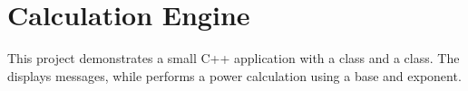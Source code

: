 \chapter{Calculation Engine }
\hypertarget{index}{}\label{index}
This project demonstrates a small C++ application with a  class and a  class. The  displays messages, while  performs a power calculation using a base and exponent. 